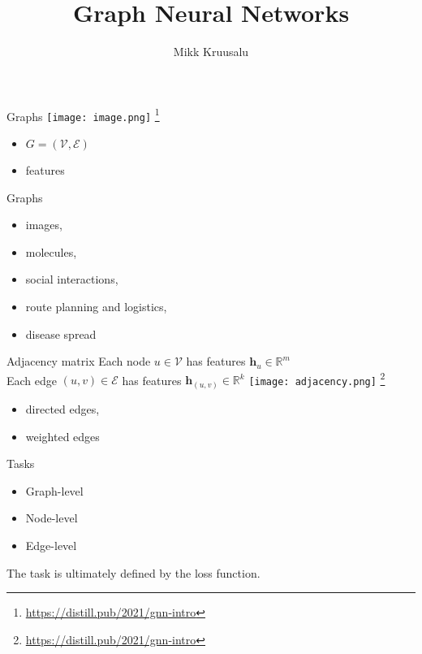 \documentclass{beamer}
\title{Graph Neural Networks}
\author{Mikk Kruusalu}
\date{}
\begin{document}
\begin{frame}
    \titlepage
\end{frame}

\begin{frame}{Graphs}
    \texttt{[image: image.png]}
    \let\thefootnote\relax\footnote{\url{https://distill.pub/2021/gnn-intro}}

    \vspace{-0.7cm}
    \begin{itemize}
        \item $G = (\mathcal{V}, \mathcal{E})$
        \item features
    \end{itemize}

\end{frame}

\begin{frame}{Graphs}
    \begin{itemize}
        \item images,
        \item molecules,
        \item social interactions,
        \item route planning and logistics,
        \item disease spread
    \end{itemize}
\end{frame}

\begin{frame}{Adjacency matrix}
    Each node $u\in\mathcal{V}$ has features $\mathbf{h}_u\in\mathbb{R}^{m}$ \\
    Each edge $(u,v)\in\mathcal{E}$ has features $\mathbf{h}_{(u,v)}\in\mathbb{R}^{k}$
    \texttt{[image: adjacency.png]}
    \let\thefootnote\relax\footnote{\url{https://distill.pub/2021/gnn-intro}}

    \vspace{-0.7cm}
    \begin{itemize}
        \item directed edges,
        \item weighted edges
    \end{itemize}
\end{frame}

\begin{frame}{Tasks}
    \begin{itemize}
        \item Graph-level
        \item Node-level
        \item Edge-level
    \end{itemize}

    The task is ultimately defined by the loss function.
\end{frame}
\end{document}
